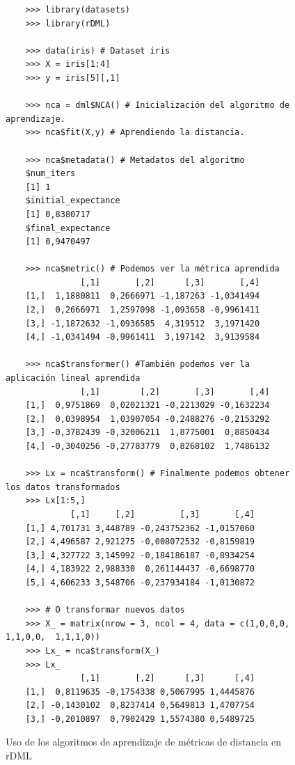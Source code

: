 \begin{figure}[h]
\begin{verbatim}
    >>> library(datasets)
    >>> library(rDML)
    
    >>> data(iris) # Dataset iris
    >>> X = iris[1:4]
    >>> y = iris[5][,1]
    
    >>> nca = dml$NCA() # Inicialización del algoritmo de aprendizaje.
    >>> nca$fit(X,y) # Aprendiendo la distancia.
    
    >>> nca$metadata() # Metadatos del algoritmo
    $num_iters
    [1] 1
    $initial_expectance
    [1] 0,8380717
    $final_expectance
    [1] 0,9470497
    
    >>> nca$metric() # Podemos ver la métrica aprendida
               [,1]       [,2]      [,3]       [,4]
    [1,]  1,1880811  0,2666971 -1,187263 -1,0341494
    [2,]  0,2666971  1,2597098 -1,093658 -0,9961411
    [3,] -1,1872632 -1,0936585  4,319512  3,1971420
    [4,] -1,0341494 -0,9961411  3,197142  3,9139584
    
    >>> nca$transformer() #También podemos ver la aplicación lineal aprendida
               [,1]        [,2]       [,3]       [,4]
    [1,]  0,9751869  0,02021321 -0,2213029 -0,1632234
    [2,]  0,0398954  1,03907054 -0,2488276 -0,2153292
    [3,] -0,3782439 -0,32006211  1,8775001  0,8850434
    [4,] -0,3040256 -0,27783779  0,8268102  1,7486132
    
    >>> Lx = nca$transform() # Finalmente podemos obtener los datos transformados
    >>> Lx[1:5,]
             [,1]     [,2]         [,3]       [,4]
    [1,] 4,701731 3,448789 -0,243752362 -1,0157060
    [2,] 4,496587 2,921275 -0,008072532 -0,8159819
    [3,] 4,327722 3,145992 -0,184186187 -0,8934254
    [4,] 4,183922 2,988330  0,261144437 -0,6698770
    [5,] 4,606233 3,548706 -0,237934184 -1,0130872
    
    >>> # O transformar nuevos datos
    >>> X_ = matrix(nrow = 3, ncol = 4, data = c(1,0,0,0,  1,1,0,0,  1,1,1,0))
    >>> Lx_ = nca$transform(X_)
    >>> Lx_
               [,1]       [,2]      [,3]      [,4]
    [1,]  0,8119635 -0,1754338 0,5067995 1,4445876
    [2,] -0,1430102  0,8237414 0,5649813 1,4707754
    [3,] -0,2010897  0,7902429 1,5574380 0,5489725
\end{verbatim}

\caption{Uso de los algoritmos de aprendizaje de métricas de distancia en rDML} \label{fig:ex_dml_r}
\end{figure}